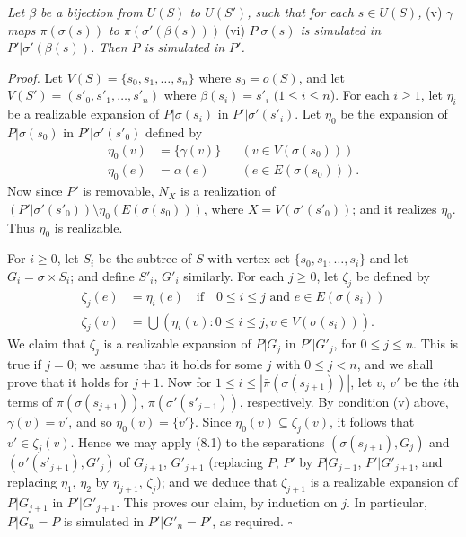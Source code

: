 \textit{Let $\beta$ be a bijection from $U(S)$ to $U(S')$, such that for each $s \in U(S)$,} (v) \textit{$\gamma$ maps $\pi(\sigma(s))$ to $\pi(\sigma'(\beta(s)))$} (vi) \textit{$P | \sigma(s)$ is simulated in $P' | \sigma'(\beta(s))$.} \textit{Then $P$ is simulated in $P'$.}

\textit{Proof.} Let $V(S) = \{s_0, s_1, \dots, s_n\}$ where $s_0 = o(S)$, and let $V(S') = (s'_0, s'_1, \dots, s'_n)$ where $\beta(s_i) = s'_i$ ($1 \le i \le n$). For each $i \ge 1$, let $\eta_i$ be a realizable expansion of $P | \sigma(s_i)$ in $P' | \sigma'(s'_i)$. Let $\eta_0$ be the expansion of $P | \sigma(s_0)$ in $P' | \sigma'(s'_0)$ defined by
\begin{align*}
\eta_0(v) &= \{\gamma(v)\} && (v \in V(\sigma(s_0))) \\
\eta_0(e) &= \alpha(e) && (e \in E(\sigma(s_0))).
\end{align*}
Now since $P'$ is removable, $N_X$ is a realization of $(P' | \sigma'(s'_0)) \setminus \eta_0(E(\sigma(s_0)))$, where $X = V(\sigma'(s'_0))$; and it realizes $\eta_0$. Thus $\eta_0$ is realizable.

For $i \ge 0$, let $S_i$ be the subtree of $S$ with vertex set $\{s_0, s_1, \dots, s_i\}$ and let $G_i = \sigma \times S_i$; and define $S'_i$, $G'_i$ similarly. For each $j \ge 0$, let $\zeta_j$ be defined by
\begin{align*}
\zeta_j(e) &= \eta_i(e) \quad \text{if} \quad 0 \le i \le j \text{ and } e \in E(\sigma(s_i)) \\
\zeta_j(v) &= \bigcup (\eta_i(v) \colon 0 \le i \le j, v \in V(\sigma(s_i))).
\end{align*}
We claim that $\zeta_j$ is a realizable expansion of $P | G_j$ in $P' | G'_j$, for $0 \le j \le n$. This is true if $j = 0$; we assume that it holds for some $j$ with $0 \le j < n$, and we shall prove that it holds for $j + 1$. Now for $1 \le i \le |\bar{\pi}(\sigma(s_{j+1}))|$, let $v$, $v'$ be the $i$th terms of $\pi(\sigma(s_{j+1}))$, $\pi(\sigma'(s'_{j+1}))$, respectively. By condition (v) above, $\gamma(v) = v'$, and so $\eta_0(v) = \{v'\}$. Since $\eta_0(v) \subseteq \zeta_j(v)$, it follows that $v' \in \zeta_j(v)$. Hence we may apply (8.1) to the separations $(\sigma(s_{j+1}), G_j)$ and $(\sigma'(s'_{j+1}), G'_j)$ of $G_{j+1}$, $G'_{j+1}$ (replacing $P$, $P'$ by $P | G_{j+1}$, $P' | G'_{j+1}$, and replacing $\eta_1$, $\eta_2$ by $\eta_{j+1}$, $\zeta_j$); and we deduce that $\zeta_{j+1}$ is a realizable expansion of $P | G_{j+1}$ in $P' | G'_{j+1}$. This proves our claim, by induction on $j$. In particular, $P | G_n = P$ is simulated in $P' | G'_n = P'$, as required. $\square$

